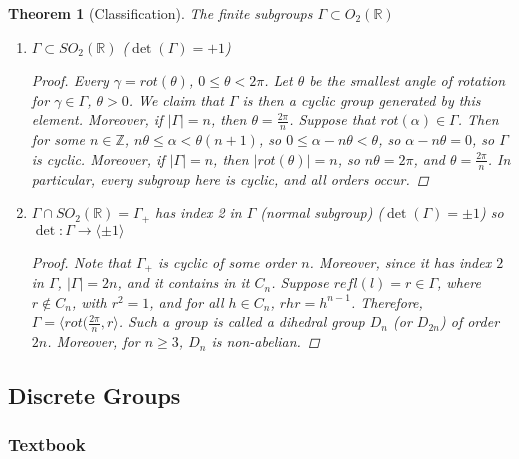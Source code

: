 \documentclass[12pt]{article}
\newtheorem{thm}{Theorem}[section]
\theoremstyle{definition}
\theoremstyle{remark}
\numberwithin{equation}{section}
\newcommand\R{\mathbb R}    %
\newcommand\Z{\mathbb Z}    %
\begin{document}
\begin{thm}[Classification]
        The finite subgroups $\Gamma \subset O_2(\R)$ \begin{enumerate}
                \item $\Gamma \subset SO_2(\R)$ ($\det(\Gamma) = +1$) \begin{proof}
                        Every $\gamma = rot(\theta)$, $0\leq \theta < 2\pi$. Let $\theta$ be the smallest angle of rotation for $\gamma \in \Gamma$, $\theta > 0$. We claim that $\Gamma$ is then a cyclic group generated by this element. Moreover, if $|\Gamma| = n$, then $\theta = \frac{2\pi}{n}$. Suppose that $rot(\alpha) \in \Gamma$. Then for some $n \in \Z$, $n\theta \leq \alpha < \theta(n+1)$, so $0 \leq \alpha - n\theta < \theta$, so $\alpha - n\theta = 0$, so $\Gamma$ is cyclic. Moreover, if $|\Gamma| = n$, then $|rot(\theta)| = n$, so $n\theta = 2\pi$, and $\theta = \frac{2\pi}{n}$. In particular, every subgroup here is cyclic, and all orders occur.
                \end{proof}
        \item $\Gamma\cap SO_2(\R) = \Gamma_+$ has index 2 in $\Gamma$ (normal subgroup) ($\det(\Gamma) = \pm 1$) so $\det:\Gamma \rightarrow \langle \pm 1\rangle$\begin{proof}
                        Note that $\Gamma_+$ is cyclic of some order $n$. Moreover, since it has index $2$ in $\Gamma$, $|\Gamma| =2n$, and it contains in it $C_n$. Suppose $refl(l) = r \in \Gamma$, where $r \notin C_n$, with $r^2 = 1$, and for all $h\in C_n$, $rhr = h^{n-1}$. Therefore, $\Gamma = \langle rot(\frac{2\pi}{n},r\rangle$. Such a group is called a dihedral group $D_n$ (or $D_{2n}$) of order $2n$. Moreover, for $n \geq 3$, $D_n$ is non-abelian.
        \end{proof}
        \end{enumerate}
\end{thm}

\vspace{15pt}

\subsection{Discrete Groups}

\subsubsection{Textbook}
\end{document}
